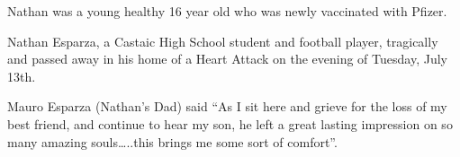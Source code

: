 Nathan was a young healthy 16 year old who was newly vaccinated with Pfizer.

Nathan Esparza, a Castaic High School student and football player, tragically
and passed away in his home of a Heart Attack on the evening of Tuesday, July
13th.

Mauro Esparza (Nathan’s Dad) said “As I sit here and grieve for the loss of my
best friend, and continue to hear my son, he left a great lasting impression on
so many amazing souls…..this brings me some sort of comfort”.

